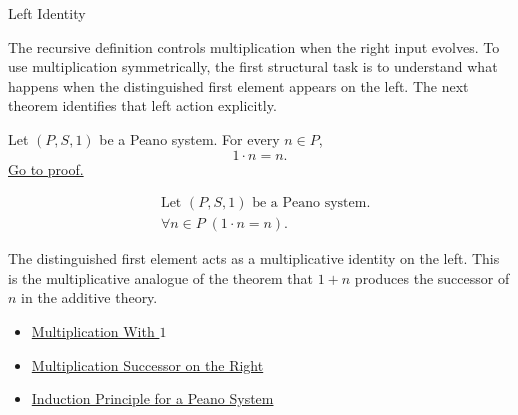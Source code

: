 \begin{topicbox}{Left Identity}
\begin{exposition}
The recursive definition controls multiplication when the right input evolves.
To use multiplication symmetrically, the first structural task is to
understand what happens when the distinguished first element appears on the
left. The next theorem identifies that left action explicitly.
\end{exposition}

\begin{tcolorbox}[colback=thmbox, colframe=thmborder, arc=2pt,
  left=6pt, right=6pt, top=4pt, bottom=4pt,
  title={\small\textbf{Theorem (One Times \texorpdfstring{$n$}{n})}},
  fonttitle=\small\bfseries]
\begin{theorem}
\label{thm:one-times-n}
Let $(P,S,1)$ be a Peano system. For every $n \in P$,
\[
1 \cdot n = n.
\]
\hyperref[prf:one-times-n]{Go to proof.}
\end{theorem}
\end{tcolorbox}

\begin{remark*}
\[
\begin{aligned}
&\text{Let } (P,S,1) \text{ be a Peano system.}\\
&\forall n \in P\;(1 \cdot n = n).
\end{aligned}
\]
\end{remark*}

\begin{remark*}[Interpretation]
The distinguished first element acts as a multiplicative identity on the left.
This is the multiplicative analogue of the theorem that $1+n$ produces the
successor of $n$ in the additive theory.
\end{remark*}

\begin{dependencies}
\begin{itemize}
  \item \hyperref[thm:multiplication-with-one]{Multiplication With $1$}
  \item \hyperref[thm:multiplication-successor-on-right]{Multiplication Successor on the Right}
  \item \hyperref[thm:induction-principle-for-peano-system]{Induction Principle for a Peano System}
\end{itemize}
\end{dependencies}
\end{topicbox}

